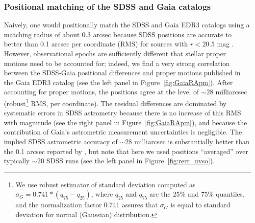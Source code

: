 \documentclass[fleqn,usenatbib]{mnras}
\begin{document}
\subsubsection{Positional matching of the SDSS and Gaia catalogs}
Naively, one would positionally match the SDSS and Gaia EDR3 catalogs using a matching radius of 
about 0.3 arcsec because SDSS positions are accurate to better than 0.1 arcsec per coordinate (RMS) 
for sources with $r < 20.5$ mag \citep{2003AJ....125.1559P}.  However, observational epochs are
sufficiently different that stellar proper motions need to be accounted for; indeed, we find a very 
strong correlation between the SDSS-Gaia positional differences and proper motions published in 
the Gaia EDR3 catalog (see the left panel in  Figure~\ref{fig:GaiaRApm}). After accounting for proper
motions,  the positions agree at the level of $\sim28$ milliarcsec (robust\footnote{We use robust estimator 
of standard deviation computed as $\sigma_G = 0.741*(q_{75}-q_{25})$, where $q_{25}$ and $q_{75}$ are 
the 25\% and 75\% quantiles, and the normalization factor 0.741 assures that $\sigma_G$ is equal to 
standard deviation for normal (Gaussian) distribution.}
RMS, per coordinate). The 
residual differences are dominated by systematic errors in SDSS astrometry because there is
no increase of this RMS with magnitude (see the right panel in Figure~\ref{fig:GaiaRApm}), and
because the contribution of Gaia's astrometric measurement uncertainties is negligible. 
The implied SDSS astrometric accuracy of $\sim28$ milliarcsec is substantially better than 
the 0.1 arcsec reported by \cite{2003AJ....125.1559P}, but note that here we used 
positions ``averaged'' over typically $\sim20$ SDSS runs (see the left panel in Figure~\ref{fig:rerr_nvso}). 
\end{document}
